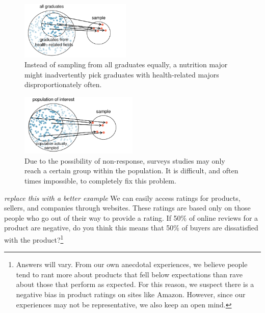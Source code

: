 \begin{doublespace}
\begin{figure}
\centering
\includegraphics[width=0.47\textwidth]{ch_intro_to_data_oi_biostat/figures/popToSample/popToSubSampleGraduates}
\caption{Instead of sampling from all graduates equally, a nutrition major might inadvertently pick graduates with health-related majors disproportionately often.}
\label{popToSubSampleGraduates}
\end{figure}




\begin{figure}[h]
\centering
\includegraphics[width=0.5\textwidth]{ch_intro_to_data_oi_biostat/figures/popToSample/surveySample}
\caption{Due to the possibility of non-response, surveys studies may only reach a certain group within the population. It is difficult, and often times impossible, to completely fix this problem.}
\label{surveySample}
\end{figure}


\begin{exercise}
	
\textit{replace this with a better example}
We can easily access ratings for products, sellers, and companies through websites. These ratings are based only on those people who go out of their way to provide a rating. If 50\% of online reviews for a product are negative, do you think this means that 50\% of buyers are dissatisfied with the product?\footnote{Answers will vary. From our own anecdotal experiences, we believe people tend to rant more about products that fell below expectations than rave about those that perform as expected. For this reason, we suspect there is a negative bias in product ratings on sites like Amazon. However, since our experiences may not be representative, we also keep an open mind.}
\end{exercise}


\end{doublespace}
